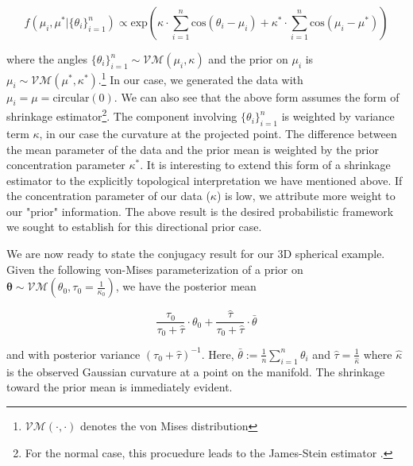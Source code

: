 \documentclass[twoside,11pt]{article}
\begin{document}
\[
  f(\mu_i, \mu^* | \{\theta_i\}_{i=1}^n) \propto \text{exp}(\kappa \cdot \sum_{i=1}^n \text{cos}(\theta_i - \mu_i) +\kappa^* \cdot \sum_{i=1}^n \text{cos}(\mu_i - \mu^*))  
\]

where the angles $\{\theta_i\}_{i=1}^n \sim \mathcal{VM}(\mu_i, \kappa)$ and the prior on $\mu_i$ is $\mu_i \sim \mathcal{VM}(\mu^*, \kappa^*).$\footnote{$\mathcal{VM}(\cdot, \cdot)$ denotes the von Mises distribution} In our case, we generated the data with $\mu_i = \mu = \text{circular}(0)$. We can also see that the above form assumes the form of shrinkage estimator\footnote{For the normal case, this procuedure leads to the James-Stein estimator \citep{guttorp1988}.}. The component involving $\{\theta_i\}_{i=1}^n$ is weighted by variance term $\kappa$, in our case the curvature at the projected point. The difference between the mean parameter of the data and the prior mean is weighted by the prior concentration parameter $\kappa^*$. It is interesting to extend this form of a shrinkage estimator to the explicitly topological interpretation we have mentioned above. If the concentration parameter of our data ($\kappa$) is low, we attribute more weight to our "prior" information. The above result is the desired probabilistic framework we sought to establish for this directional prior case.

We are now ready to state the conjugacy result for our 3D spherical example. Given the following von-Mises parameterization of a prior on $\boldsymbol{\theta} \sim \mathcal{VM}(\theta_0, \tau_0 = \frac{1}{\kappa_0})$, we have the posterior mean 

\[
  \frac{\tau_0}{\tau_0 + \hat{\tau}} \cdot \theta_0 + \frac{\hat{\tau}}{\tau_0 + \hat{\tau}} \cdot \bar{\theta}
\]

and with posterior variance $(\tau_0 + \hat{\tau})^{-1}$. Here, $\bar{\theta} := \frac{1}{n}\sum_{i=1}^n \theta_i$ and $\hat{\tau} = \frac{1}{\hat{\kappa}}$ where $\hat{\kappa}$ is the observed Gaussian curvature at a point on the manifold. The shrinkage toward the prior mean is immediately evident.  
\end{document}
